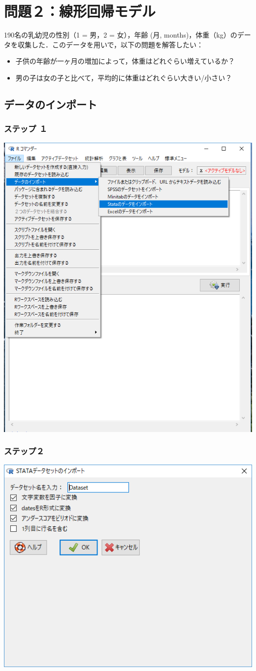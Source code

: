 \documentclass[11pt,]{problemset}
\begin{document}
\newpage
\vfill

\section{問題２：線形回帰モデル}

190名の乳幼児の性別（1 = 男，2 = 女），年齢 (月,
months)，体重（kg）のデータを収集した．このデータを用いで，以下の問題を解答したい：

\begin{itemize}
\item
  子供の年齢が一ヶ月の増加によって，体重はどれぐらい増えているか？
\item
  男の子は女の子と比べて，平均的に体重はどれぐらい大きい/小さい？
\end{itemize}

\subsection{データのインポート}

\subsubsection{ステップ １}

\begin{center}\includegraphics[width=0.5\linewidth]{pic/import00} \end{center}

\hypertarget{-1}{%
\subsubsection{ステップ２}\label{-1}}

\begin{center}\includegraphics[width=0.5\linewidth]{pic/import02} \end{center}
\end{document}
